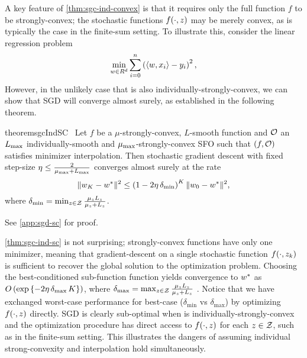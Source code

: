 A key feature of \autoref{thm:sgc-ind-convex} is that it requires only the full function \( f \) to be strongly-convex; the stochastic functions \( f(\cdot, \z) \) may be merely convex, as is typically the case in the finite-sum setting.
To illustrate this, consider the linear regression problem
\[ \min_{\w \in R^d} \sum_{i=0}^n \rbr{\abr{\w, x_i} - y_i}^2, \]
However, in the unlikely case that \oracle{} is also individually-strongly-convex, we can show that \ac{SGD} will converge almost surely, as established in the following theorem.

\begin{restatable}{theorem}{sgcIndSC}~\label{thm:sgc-ind-sc}
    Let \( f \) be a \( \mu \)-strongly-convex, \( L \)-smooth function and \( \oracle{} \) an \( \Lmax \) individually-smooth and \( \mumax \)-strongly-convex \ac{SFO} such that \( \rbr{f, \oracle{}} \) satisfies minimizer interpolation. 
    Then stochastic gradient descent with fixed step-size \( \eta \leq \frac{2}{\mumax + \Lmax} \) converges almost surely at the rate 
    \[ \norm{\w_{K} - \wopt}^2 \leq \rbr{1 - 2 \eta \, \delta_{\text{min}} }^K \norm{\w_0 - \wopt}^2, \] 
    where \( \delta_{\text{min}} = \min_{\z \in \calZ} \frac{\mu_\z L_\z}{\mu_\z + L_\z} \).
\end{restatable}%
\noindent See \autoref{app:sgd-sc} for proof.\hfill \break

\autoref{thm:sgc-ind-sc} is not surprising; strongly-convex functions have only one minimizer, meaning that gradient-descent on a single stochastic function \( f(\cdot, \zk) \) is sufficient to recover the global solution to the optimization problem.
Choosing the best-conditioned sub-function function yields convergence to \( \wopt \) as \( O\rbr{\exp\cbr{ - 2 \eta \, \delta_{\text{max}} \, K}} \), where \( \delta_{\text{max}} = \max_{\z \in \calZ} \frac{\mu_z L_\z}{\mu_z + L_\z} \) \citep{bubeck2015convex}.
Notice that we have exchanged worst-case performance for best-case (\( \delta_{\text{min}} \) vs \( \delta_{\text{max}} \)) by optimizing \( f(\cdot, \z) \) directly.
\ac{SGD} is clearly sub-optimal when \oracle{} is individually-strongly-convex and the optimization procedure has direct access to \( f(\cdot, \z ) \) for each \( \z \in \calZ \), such as in the finite-sum setting. 
This illustrates the dangers of assuming individual strong-convexity and interpolation hold simultaneously.

